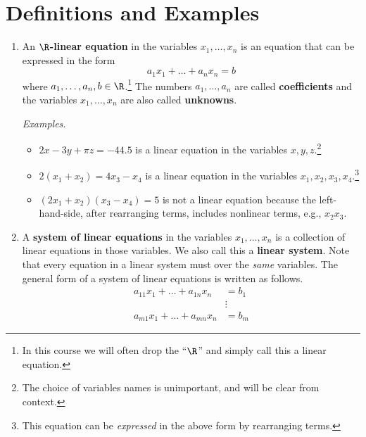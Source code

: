 \section{Definitions and Examples}

\begin{enumerate}
\item An \textbf{$\R$-linear equation} in the variables $x_1, \dots,
  x_n$ is an equation that can be expressed in the form
  \begin{displaymath}
    a_1 x_1 + \dots + a_n x_n = b
  \end{displaymath}
  where $a_1, \dots, a_n, b \in \R$.\footnote{In this course we will
  often drop the ``$\R$'' and simply call this a linear equation.}
  The numbers $a_1, \dots, a_n$ are called \textbf{coefficients} and
  the variables $x_1, \dots, x_n$ are also called \textbf{unknowns}.

  \textit{Examples.}
  \begin{itemize}
  \item $2x - 3y + \pi z = -44.5$ is a linear equation in the
    variables $x, y, z$.\footnote{The choice of variables names is
    unimportant, and will be clear from context.}
  \item $2(x_1 + x_2) = 4x_3 - x_4$ is a linear equation in the
    variables $x_1, x_2, x_3, x_4$.\footnote{This equation can be
    \textit{expressed} in the above form by rearranging terms.}
  \item $(2x_1 + x_2)(x_3 - x_4) = 5$ is not a linear equation because
    the left-hand-side, after rearranging terms, includes
    nonlinear terms, e.g., $x_2x_3$.
  \end{itemize}
\item A \textbf{system of linear equations} in the variables $x_1,
  \dots, x_n$ is a collection of linear equations in those variables.
  We also call this a \textbf{linear system}.  Note that every
  equation in a linear system must over the \textit{same} variables.
  The general form of a system of linear equations is written as
  follows.
  \begin{equation}
    \begin{split}
      a_{11}x_1 + \dots + a_{1n} x_n &= b_1 \\
      &\vdots \\
      a_{m1}x_1 + \dots + a_{mn} x_n &= b_m
    \end{split}
    \label{gen-form-lin-sys}
  \end{equation}


\end{enumerate}

